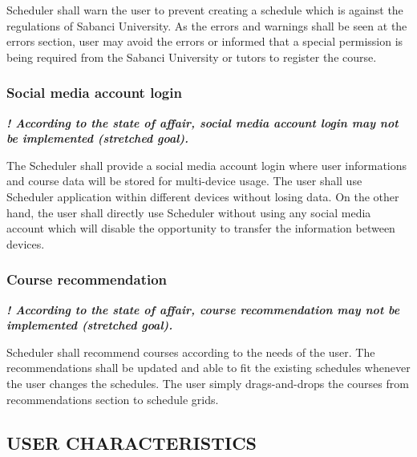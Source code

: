 \documentclass[twoside,letterpaper]{article}
\begin{document}
{\color{black}
	Scheduler shall warn the user to prevent creating a schedule which is against the regulations of Sabanci University. As the errors and warnings shall be seen at the errors section, user may avoid the errors or informed that a special permission is being required from the Sabanci University or tutors to register the course.}
	
\subsubsection[Social media account login
]{\rmfamily\bfseries\color{black}
	Social media account login}

{\noindent{}\color{black}
	\textbf{\emph{! According to the state of affair, social media account login may not be implemented (stretched goal).}}}

\smallskip

{\color{black}
	The Scheduler shall provide a social media account login where user informations and course data will be stored for multi-device usage. The user shall use Scheduler application within different devices without losing data. On the other hand, the user shall directly use Scheduler without using any social media account which will disable the opportunity to transfer the information between devices. }


\subsubsection[Course 
recommendation]{\rmfamily\bfseries\color{black}
	Course recommendation}
{\noindent{}\color{black}
	\textbf{\emph{! According to the state of affair, course recommendation may not be implemented (stretched goal).}}}
	
\smallskip

{\color{black}
	Scheduler shall recommend courses according to the needs of the user. The recommendations shall be updated and able to fit the existing schedules whenever the user changes the schedules. The user simply drags-and-drops the courses from recommendations section to schedule grids.}
\subsection[USER
CHARACTERISTICS]{\rmfamily\bfseries\color{black}
USER CHARACTERISTICS}
\end{document}
